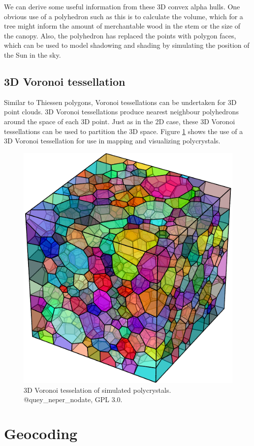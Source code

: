 \documentclass[
]{book}
\begin{document}
We can derive some useful information from these 3D convex alpha hulls. One obvious use of a polyhedron such as this is to calculate the volume, which for a tree might inform the amount of merchantable wood in the stem or the size of the canopy. Also, the polyhedron has replaced the points with polygon faces, which can be used to model shadowing and shading by simulating the position of the Sun in the sky.

\hypertarget{d-voronoi-tessellation}{%
\subsection{3D Voronoi tessellation}\label{d-voronoi-tessellation}}

Similar to Thiessen polygons, Voronoi tessellations can be undertaken for 3D point clouds. 3D Voronoi tessellations produce nearest neighbour polyhedrons around the space of each 3D point. Just as in the 2D case, these 3D Voronoi tessellations can be used to partition the 3D space. Figure \ref{fig:7-neper} shows the use of a 3D Voronoi tessellation for use in mapping and visualizing polycrystals.

\begin{figure}
\includegraphics[width=0.75\linewidth]{images/07-neper} \caption{3D Voronoi tesselation of simulated polycrystals. @quey_neper_nodate, GPL 3.0.}\label{fig:7-neper}
\end{figure}

\hypertarget{geocoding}{%
\section{Geocoding}\label{geocoding}}
\end{document}
